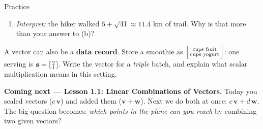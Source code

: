 \documentclass[10pt]{article}
\newcommand{\vv}{\mathbf{v}}
\newcommand{\ww}{\mathbf{w}}
\begin{document}
\begin{notesbox}{Practice}
\begin{enumerate}[leftmargin=1.9em, itemsep=12pt]
\begin{enumerate}[label=(\alph*), leftmargin=1.8em, itemsep=6pt]
\begin{work}
  \left\|\begin{bsmallmatrix} 8 \\ 0 \end{bsmallmatrix}\right\| &=  \\
                                                                &= 8 
\end{work}
      \item \emph{Interpret:} the hiker walked $5+\sqrt{41}\approx 11.4$ km of trail. Why is
            that more than your answer to (b)?
    \end{enumerate}
\end{enumerate}
\end{notesbox}

\begin{extensionbox}
A vector can also be a \textbf{data record}. Store a smoothie as
$\begin{bsmallmatrix} \text{cups fruit} \\ \text{cups yogurt} \end{bsmallmatrix}$: one
serving is $\mathbf{s}=\begin{bsmallmatrix} 2 \\ 1 \end{bsmallmatrix}$. Write the vector for a
\emph{triple} batch, and explain what scalar multiplication means in this setting.
\end{extensionbox}

\begin{spiralbox}
\textbf{Coming next --- Lesson 1.1: Linear Combinations of Vectors.} Today you scaled
vectors ($c\,\vv$) and added them ($\vv+\ww$). Next we do both at once: $c\,\vv + d\,\ww$.
The big question becomes: \emph{which points in the plane can you reach} by combining two
given vectors?
\end{spiralbox}
\end{document}
